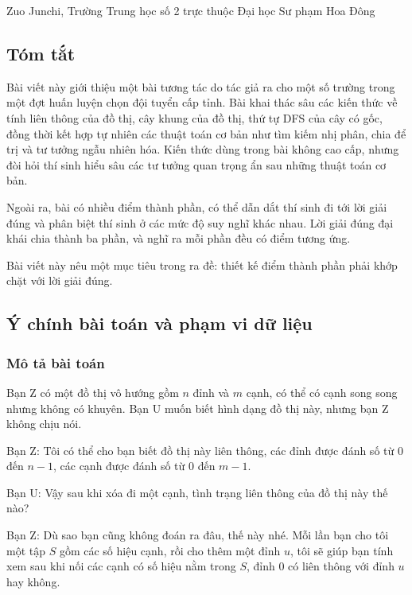 \documentclass[11pt]{article}
\begin{document}
\begin{center}
Zuo Junchi, Trường Trung học số 2 trực thuộc Đại học Sư phạm Hoa Đông
\end{center}

\subsection*{Tóm tắt}

Bài viết này giới thiệu một bài tương tác do tác giả ra cho một số trường trong
một đợt huấn luyện chọn đội tuyển cấp tỉnh. Bài khai thác sâu các kiến thức về
tính liên thông của đồ thị, cây khung của đồ thị, thứ tự DFS của cây có gốc,
đồng thời kết hợp tự nhiên các thuật toán cơ bản như tìm kiếm nhị phân, chia để
trị và tư tưởng ngẫu nhiên hóa. Kiến thức dùng trong bài không cao cấp, nhưng
đòi hỏi thí sinh hiểu sâu các tư tưởng quan trọng ẩn sau những thuật toán cơ
bản.

Ngoài ra, bài có nhiều điểm thành phần, có thể dẫn dắt thí sinh đi tới lời giải
đúng và phân biệt thí sinh ở các mức độ suy nghĩ khác nhau. Lời giải đúng đại
khái chia thành ba phần, và nghĩ ra mỗi phần đều có điểm tương ứng.

Bài viết này nêu một mục tiêu trong ra đề: thiết kế điểm thành phần phải khớp
chặt với lời giải đúng.

\subsection{Ý chính bài toán và phạm vi dữ liệu}

\subsubsection{Mô tả bài toán}

Bạn Z có một đồ thị vô hướng gồm \(n\) đỉnh và \(m\) cạnh, có thể có cạnh song
song nhưng không có khuyên. Bạn U muốn biết hình dạng đồ thị này, nhưng bạn Z
không chịu nói.

Bạn Z: Tôi có thể cho bạn biết đồ thị này liên thông, các đỉnh được đánh số từ
\(0\) đến \(n-1\), các cạnh được đánh số từ \(0\) đến \(m-1\).

Bạn U: Vậy sau khi xóa đi một cạnh, tình trạng liên thông của đồ thị này thế
nào?

Bạn Z: Dù sao bạn cũng không đoán ra đâu, thế này nhé. Mỗi lần bạn cho tôi một
tập \(S\) gồm các số hiệu cạnh, rồi cho thêm một đỉnh \(u\), tôi sẽ giúp bạn
tính xem sau khi nối các cạnh có số hiệu nằm trong \(S\), đỉnh \(0\) có liên
thông với đỉnh \(u\) hay không.
\end{document}
